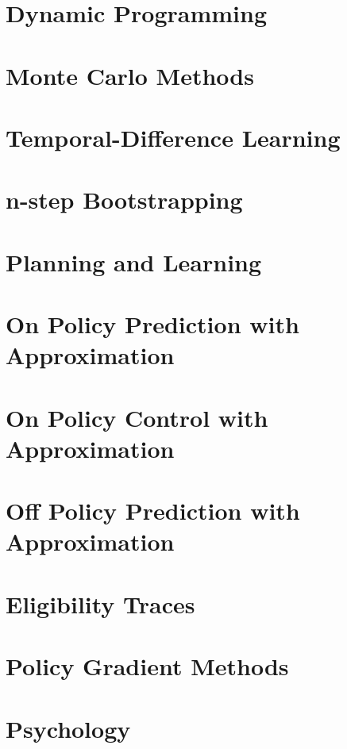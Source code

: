 \documentclass[10pt, landscape, a4paper]{article}
\begin{document}
\begin{multicols}{3}
        \section{Dynamic Programming}


        \section{Monte Carlo Methods}


        \section{Temporal-Difference Learning}


        \section{n-step Bootstrapping}


        \section{Planning and Learning}


        \section{On Policy Prediction with Approximation}


        \section{On Policy Control with Approximation}


        \section{Off Policy Prediction with Approximation}


        \section{Eligibility Traces}


        \section{Policy Gradient Methods}


        \section{Psychology}



\end{multicols}
\end{document}
